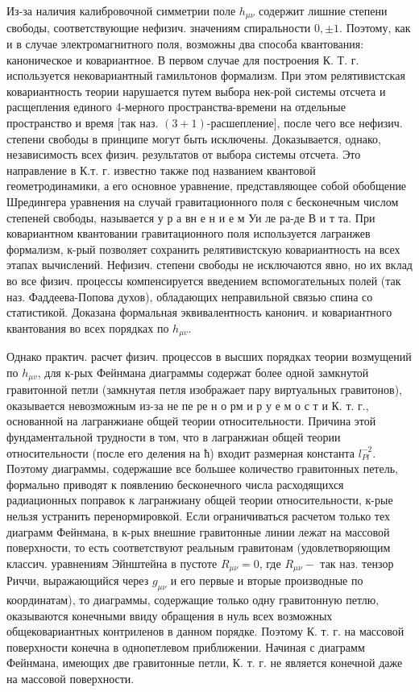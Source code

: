 \documentclass[10pt]{article}
\begin{document}
Из-за наличия калибровочной симметрии поле $h_{\mu \nu}$ содержит лишние степени свободы, соответствующие нефизич. значениям спиральности $0, \pm 1$. Поэтому, как и в случае электромагнитного поля, возможны два способа квантования: каноническое и ковариантное. В первом случае для построения К. Т. г. используется нековариантный гамильтонов формализм. При этом релятивистская ковариантность теории нарушается путем выбора нек-рой системы отсчета и расщепления единого 4-мерного пространства-времени на отдельные пространство и время [так наз. $(3+1)$-расшепление], после чего все нефизич. степени свободы в принципе могут быть исключены. Доказывается, однако, независимость всех физич. результатов от выбора системы отсчета. Это направление в К.т. г. известно также под названием квантовой геометродинамики, а его основное уравнение, представляющее собой обобщение Шредингера уравнения на случай гравитационного поля с бесконечным числом степеней свободы, называется у р а вн е н и е м Уи ле ра-де В и т та. При ковариантном квантовании гравитационного поля используется лагранжев формализм, к-рый позволяет сохранить релятивистскую ковариантность на всех этапах вычислений. Нефизич. степени свободы не исключаются явно, но их вклад во все физич. процессы компенсируется введением вспомогательных полей (так наз. Фаддеева-Попова духов), обладающих неправильной связью спина со статистикой. Доказана формальная эквивалентность канонич. и ковариантного квантования во всех порядках по $h_{\mu v}$.



Однако практич. расчет физич. процессов в высших порядках теории возмущений по $h_{\mu v}$, для к-рых Фейнмана диаграммы содержат более одной замкнутой гравитонной петли (замкнутая петля изображает пару виртуальных гравитонов), оказывается невозможным из-за не пе ре н о рм и р у е м о с т и К. т. г., основанной на лагранжиане общей теории относительности. Причина этой фундаментальной трудности в том, что в лагранжиан общей теории относительности (после его деления на ћ) входит размерная константа $l_{P l}^{-2}$. Поэтому диаграммы, содержашие все большее количество гравитонных петель, формально приводят к появлению бесконечного числа расходящихся радиационных поправок к лагранжиану общей теории относительности, к-рые нельзя устранить перенормировкой. Если ограничиваться расчетом только тех диаграмм Фейнмана, в к-рых внешние гравитонные линии лежат на массовой поверхности, то есть соответствуют реальным гравитонам (удовлетворяющим классич. уравнениям Эйнштейна в пустоте $R_{\mu \nu}=0$, где $R_{\mu \nu}-$ так наз. тензор Риччи, выражающийся через $g_{\mu \nu}$ и его первые и вторые производные по координатам), то диаграммы, содержащие только одну гравитонную петлю, оказываются конечными ввиду обращения в нуль всех возможных общековариантных контриленов в данном порядке. Поэтому К. т. г. на массовой поверхности конечна в однопетлевом приближении. Начиная с диаграмм Фейнмана, имеющих две гравитонные петли, К. т. г. не является конечной даже на массовой поверхности.
\end{document}
